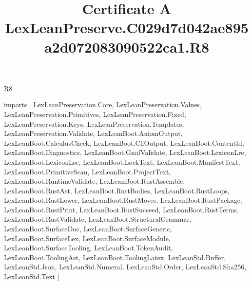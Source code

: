 \begin{lexlean}{R8}
\title{Certificate A LexLeanPreserve.C029d7d042ae895a2d072083090522ca1.R8}
\begin{coremodule}
imports [
  LexLeanPreservation.Core,
  LexLeanPreservation.Values,
  LexLeanPreservation.Primitives,
  LexLeanPreservation.Fixed,
  LexLeanPreservation.Keys,
  LexLeanPreservation.Templates,
  LexLeanPreservation.Validate,
  LexLeanBoot.AxiomOutput,
  LexLeanBoot.CalculusCheck,
  LexLeanBoot.CliOutput,
  LexLeanBoot.ContentId,
  LexLeanBoot.Diagnostics,
  LexLeanBoot.GnafValidate,
  LexLeanBoot.LexiconLre,
  LexLeanBoot.LexiconLse,
  LexLeanBoot.LockText,
  LexLeanBoot.ManifestText,
  LexLeanBoot.PrimitiveScan,
  LexLeanBoot.ProjectText,
  LexLeanBoot.RuntimeValidate,
  LexLeanBoot.RustAssemble,
  LexLeanBoot.RustAst,
  LexLeanBoot.RustBodies,
  LexLeanBoot.RustLoops,
  LexLeanBoot.RustLower,
  LexLeanBoot.RustMoves,
  LexLeanBoot.RustPackage,
  LexLeanBoot.RustPrint,
  LexLeanBoot.RustSucceed,
  LexLeanBoot.RustTerms,
  LexLeanBoot.RustValidate,
  LexLeanBoot.StructuralGrammar,
  LexLeanBoot.SurfaceDoc,
  LexLeanBoot.SurfaceGeneric,
  LexLeanBoot.SurfaceLex,
  LexLeanBoot.SurfaceModule,
  LexLeanBoot.SurfaceTooling,
  LexLeanBoot.TokenAudit,
  LexLeanBoot.ToolingAst,
  LexLeanBoot.ToolingLatex,
  LexLeanStd.Buffer,
  LexLeanStd.Json,
  LexLeanStd.Numeral,
  LexLeanStd.Order,
  LexLeanStd.Sha256,
  LexLeanStd.Text
]


\end{coremodule}
\end{lexlean}
